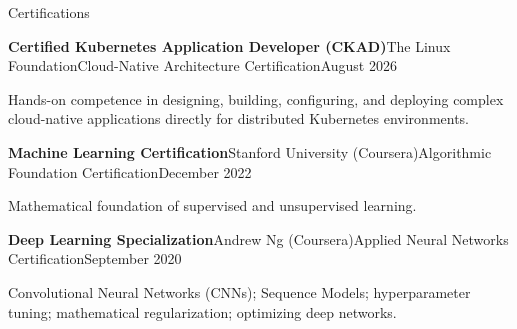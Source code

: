 \documentclass{resume} %
\newcommand{\plainitem}[1]{\item{#1}}
\begin{document}
\begin{rSection}{Certifications}

    \begin{rSubsectionNoBullet}{\bf Certified Kubernetes Application Developer (CKAD)}{The Linux Foundation}{Cloud-Native Architecture Certification}{August 2026}
        \plainitem{Hands-on competence in designing, building, configuring, and deploying complex cloud-native applications directly for distributed Kubernetes environments.}
    \end{rSubsectionNoBullet}
    
    \begin{rSubsectionNoBullet}{\bf Machine Learning Certification}{Stanford University (Coursera)}{Algorithmic Foundation Certification}{December 2022}
        \plainitem{Mathematical foundation of supervised and unsupervised learning.}
    \end{rSubsectionNoBullet}
    
    \begin{rSubsectionNoBullet}{\bf Deep Learning Specialization}{Andrew Ng (Coursera)}{Applied Neural Networks Certification}{September 2020}
        \plainitem{Convolutional Neural Networks (CNNs); Sequence Models; hyperparameter tuning; mathematical regularization; optimizing deep networks.}
    \end{rSubsectionNoBullet}

\end{rSection}
\end{document}
